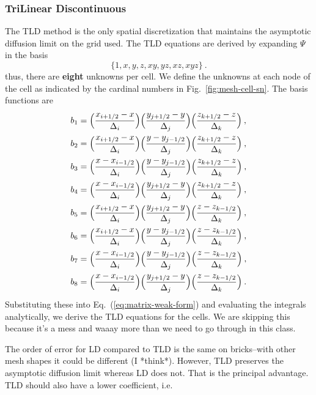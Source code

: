 \documentclass[12pt]{article}
\newcommand{\Di}{\ensuremath{\Delta_i}}
\newcommand{\Dj}{\ensuremath{\Delta_j}}
\newcommand{\Dk}{\ensuremath{\Delta_k}}
\begin{document}
\subsubsection*{TriLinear Discontinuous}
The TLD method is the only spatial discretization that maintains the
asymptotic diffusion limit on the grid used.  The
TLD equations are derived by expanding $\Psi$ in the basis
\begin{equation*}
  \{1,x,y,z,xy,yz,xz,xyz\}\:.
\end{equation*}
thus, there are \textbf{eight} unknowns per cell.  We define the unknowns at each node
of the cell as indicated by the cardinal numbers in Fig.~\ref{fig:mesh-cell-sn}.
The basis functions are
\begin{equation}
  \begin{aligned}
    b_1 &= \Bigl(\frac{x_{i+1/2}-x}{\Di}\Bigr)
    \Bigl(\frac{y_{j+1/2}-y}{\Dj}\Bigr) \Bigl(\frac{z_{k+1/2}-z}{\Dk}\Bigr)\:,\\
    b_2 &= \Bigl(\frac{x_{i+1/2}-x}{\Di}\Bigr)
    \Bigl(\frac{y-y_{j-1/2}}{\Dj}\Bigr) \Bigl(\frac{z_{k+1/2}-z}{\Dk}\Bigr)\:,\\
    b_3 &= \Bigl(\frac{x-x_{i-1/2}}{\Di}\Bigr)
    \Bigl(\frac{y-y_{j-1/2}}{\Dj}\Bigr) \Bigl(\frac{z_{k+1/2}-z}{\Dk}\Bigr)\:,\\
    b_4 &= \Bigl(\frac{x-x_{i-1/2}}{\Di}\Bigr)
    \Bigl(\frac{y_{j+1/2}-y}{\Dj}\Bigr) \Bigl(\frac{z_{k+1/2}-z}{\Dk}\Bigr)\:,\\
    b_5 &= \Bigl(\frac{x_{i+1/2}-x}{\Di}\Bigr)
    \Bigl(\frac{y_{j+1/2}-y}{\Dj}\Bigr) \Bigl(\frac{z-z_{k-1/2}}{\Dk}\Bigr)\:,\\
    b_6 &= \Bigl(\frac{x_{i+1/2}-x}{\Di}\Bigr)
    \Bigl(\frac{y-y_{j-1/2}}{\Dj}\Bigr) \Bigl(\frac{z-z_{k-1/2}}{\Dk}\Bigr)\:,\\
    b_7 &= \Bigl(\frac{x-x_{i-1/2}}{\Di}\Bigr)
    \Bigl(\frac{y-y_{j-1/2}}{\Dj}\Bigr) \Bigl(\frac{z-z_{k-1/2}}{\Dk}\Bigr)\:,\\
    b_8 &= \Bigl(\frac{x-x_{i-1/2}}{\Di}\Bigr)
    \Bigl(\frac{y_{j+1/2}-y}{\Dj}\Bigr) \Bigl(\frac{z-z_{k-1/2}}{\Dk}\Bigr)\:.
  \end{aligned}
  \label{eq:tld_basis}
\end{equation}
Substituting these into Eq.~(\ref{eq:matrix-weak-form}) and evaluating the
integrals analytically, we derive the TLD equations for the cells. We are skipping this because it's a mess and waaay more than we need to go through in this class. 


The order of error for LD compared to TLD is the same on bricks--with other mesh shapes it could be different (I *think*). However, TLD preserves the asymptotic diffusion limit whereas LD does not. That is the principal advantage. TLD should also have a lower coefficient, i.e.
\end{document}
